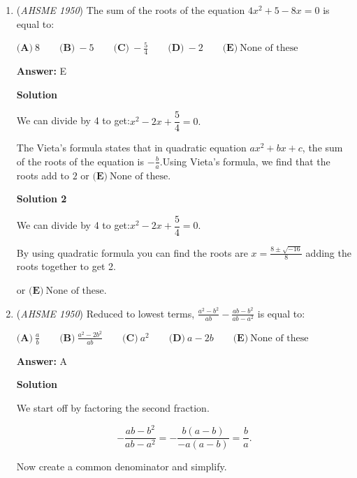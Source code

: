 \begin{enumerate}
Our first procedure is to find the value of $g$. With the given variables' values, we can see that $8g-4=16$ so $g=\frac{20}{8}=\frac{5}{2}$.

 With that, we can replace $g$ with $\frac{5}{2}$. When $S=10$, we can see that $10\times\frac{5}{2}-4=\frac{50}{2}-4=25-4=\boxed{\text{(D) 21}}$.

 


	\item (\textit{AHSME 1950}) The sum of the roots of the equation $4x^{2}+5-8x=0$ is equal to:


 $\textbf{(A)}\ 8\qquad\textbf{(B)}\ -5\qquad\textbf{(C)}\ -\frac{5}{4}\qquad\textbf{(D)}\ -2\qquad\textbf{(E)}\ \text{None of these}$

 \textbf{Answer: }E



\textbf{Solution}

We can divide by 4 to get:$x^{2}-2x+\dfrac{5}{4}=0.$

 The Vieta's formula states that in quadratic equation $ax^2+bx+c$, the sum of the roots of the equation is $-\frac{b}{a}$.Using Vieta's formula, we find that the roots add to $2$ or $\boxed{\textbf{(E)}\ \text{None of these}}$.

 



\textbf{Solution 2}

We can divide by 4 to get:$x^{2}-2x+\dfrac{5}{4}=0.$

 By using quadratic formula you can find the roots are \(x=\frac{8\pm \sqrt{-16}}{8}\) adding the roots together to get 2.

 or $\boxed{\textbf{(E)}\ \text{None of these}}$.

 


	\item (\textit{AHSME 1950}) Reduced to lowest terms, $\frac{a^{2}-b^{2}}{ab} - \frac{ab-b^{2}}{ab-a^{2}}$ is equal to:


 $\textbf{(A)}\ \frac{a}{b}\qquad\textbf{(B)}\ \frac{a^{2}-2b^{2}}{ab}\qquad\textbf{(C)}\ a^{2}\qquad\textbf{(D)}\ a-2b\qquad\textbf{(E)}\ \text{None of these}$

 \textbf{Answer: }A



\textbf{Solution}

We start off by factoring the second fraction.

 
 \[-\frac{ab-b^2}{ab-a^2} = -\frac{b(a-b)}{-a(a-b)} = \frac{b}{a}.\]

 Now create a common denominator and simplify.


\end{enumerate}
